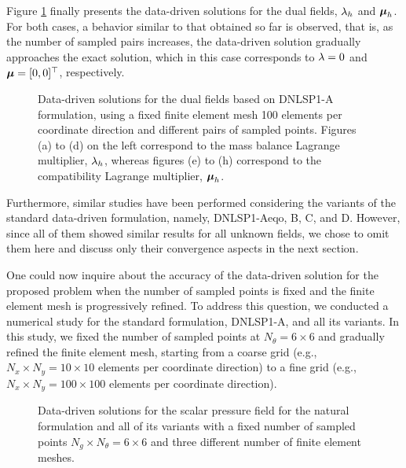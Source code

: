   
Figure \ref{fig:DNLSP1_A_plt_over_line_lm} finally presents the data-driven solutions for the dual fields, $ \lambda_h $ and $ \boldsymbol{\mu}_h $. For both cases, a behavior similar to that obtained so far is observed, that is, as the number of sampled pairs increases, the data-driven solution gradually approaches the exact solution, which in this case corresponds to $ \lambda = 0 $ and $ \boldsymbol{\mu} = [0,0]^{\top} $, respectively. 


\begin{figure}[h!]
	\centering
	\caption{Data-driven solutions for the dual fields based on DNLSP1-A formulation, using a fixed finite element mesh 100 elements per coordinate direction and different pairs of sampled points. Figures (a) to (d) on the left correspond to the mass balance Lagrange multiplier, $ \lambda_h$, whereas figures (e) to (h) correspond to the compatibility Lagrange multiplier, $ \boldsymbol{\mu}_h $.}
	\fontsize{6pt}{10pt}\selectfont 
	\def\svgwidth{\columnwidth}
	
	\label{fig:DNLSP1_A_plt_over_line_lm}
\end{figure}


Furthermore, similar studies have been performed considering the variants of the standard data-driven formulation, namely, DNLSP1-Aeqo, B, C, and D. However, since all of them showed similar results for all unknown fields, we chose to omit them here and discuss only their convergence aspects in the next section.

One could now inquire about the accuracy of the data-driven solution for the proposed problem when the number of sampled points is fixed and the finite element mesh is progressively refined. To address this question, we conducted a numerical study for the standard formulation, DNLSP1-A, and all its variants. In this study, we fixed the number of sampled points at \( N_{\theta} = 6 \times 6 \) and gradually refined the finite element mesh, starting from a coarse grid (e.g., \( N_{x} \times N_{y} = 10 \times 10 \) elements per coordinate direction) to a fine grid (e.g., \( N_{x} \times N_{y} = 100 \times 100 \) elements per coordinate direction). 

\begin{figure}[h!]
	\centering
	\caption{Data-driven solutions for the scalar pressure field for the natural formulation and all of its variants with a fixed number of sampled points $ N_{g} \times N_{\theta} = 6 \times 6 $ and three different number of finite element meshes. }
	\def\svgwidth{\columnwidth}
	
	\label{fig:sol_DNLSP1_plt_over_line_u_fem_mesh}
\end{figure}

